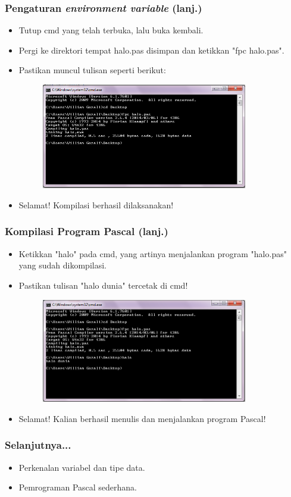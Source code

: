 \begin{frame}
\frametitle{Pengaturan \textit{environment variable} (lanj.)}
\begin{itemize}
  \item Tutup cmd yang telah terbuka, lalu buka kembali.
  \item Pergi ke direktori tempat halo.pas disimpan dan ketikkan "fpc halo.pas".
  \item Pastikan muncul tulisan seperti berikut:
  \begin{figure}
    \includegraphics[width=9cm]{asset/hello_3.PNG}
  \end{figure}
  \item Selamat! Kompilasi berhasil dilaksanakan!
\end{itemize}
\end{frame}

\begin{frame}
\frametitle{Kompilasi Program Pascal (lanj.)}
\begin{itemize}
  \item Ketikkan "halo" pada cmd, yang artinya menjalankan program "halo.pas" yang sudah dikompilasi.
  \item Pastikan tulisan "halo dunia" tercetak di cmd!
  \begin{figure}
    \includegraphics[width=9cm]{asset/hello_4.PNG}
  \end{figure}
  \item Selamat! Kalian berhasil menulis dan menjalankan program Pascal!
\end{itemize}
\end{frame}

\begin{frame}
\frametitle{Selanjutnya...}
\begin{itemize}
  \item Perkenalan variabel dan tipe data.
  \item Pemrograman Pascal sederhana.
\end{itemize}
\end{frame}


